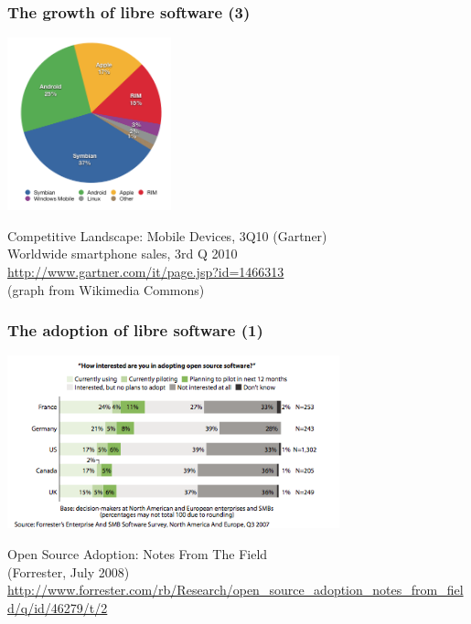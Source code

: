 
\begin{frame}
\frametitle{The growth of libre software (3)}

\includegraphics[height=5cm]{figs/smartphone-share-gartner-2010-q3}

\begin{flushright}
Competitive Landscape: Mobile Devices, 3Q10 (Gartner)\\
Worldwide smartphone sales, 3rd Q 2010 \\
{\small \url{http://www.gartner.com/it/page.jsp?id=1466313}} \\
(graph from Wikimedia Commons)
\end{flushright}
\end{frame}



\begin{frame}
\frametitle{The adoption of libre software (1)}

\includegraphics[height=5cm]{figs/adoption-interest-forrester-2007-q3}

\begin{flushright}
Open Source Adoption: Notes From The Field \\
(Forrester, July 2008) \\
{\small \url{http://www.forrester.com/rb/Research/open_source_adoption_notes_from_field/q/id/46279/t/2}} 
\end{flushright}
\end{frame}

